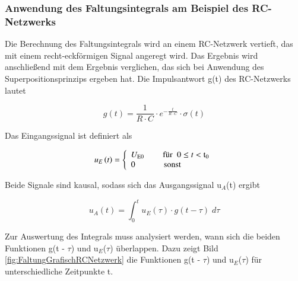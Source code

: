 \subsubsection{Anwendung des Faltungsintegrals am Beispiel des RC-Netzwerks}\label{threefourfour}

\noindent Die Berechnung des Faltungsintegrals wird an einem RC-Netzwerk vertieft, das mit einem recht-eckförmigen Signal angeregt wird. Das Ergebnis wird anschließend mit dem Ergebnis verglichen, das sich bei Anwendung des Superpositionsprinzips ergeben hat. Die Impulsantwort g(t) des RC-Netzwerks lautet

\begin{equation}\label{eq:threehundredseventyfour}
g\left(t\right)=\frac{1}{R\cdot C} \cdot e^{-\frac{t}{R\cdot C} } \cdot \sigma \left(t\right)
\end{equation}

\noindent Das Eingangssignal ist definiert als

\begin{equation}\label{eq:threehundredseventyfive}
u_{E} \left(t\right)=\left\{\begin{array}{l} 
{U_{{\rm E0}} \qquad  \text{ für } \; 0\le  t<\rm t_{0} } \\ 
0\qquad \quad \;\, \text{sonst}
\end{array}\right.
\end{equation}

\noindent Beide Signale sind kausal, sodass sich das Ausgangssignal u${}_{A}$(t) ergibt

\begin{equation}\label{eq:threehundredseventysix}
u_{A} \left(t\right)=\int _{0}^{t}u_{E} \left(\tau \right)\cdot g\left(t-\tau \right)\;d\tau
\end{equation}

\noindent Zur Auswertung des Integrals muss analysiert werden, wann sich die beiden Funktionen g(t - $\tau$) und u${}_{E}$($\tau$) \"{u}berlappen. Dazu zeigt Bild \ref{fig:FaltungGrafischRCNetzwerk} die Funktionen g(t - $\tau$) und u${}_{E}$($\tau$) f\"{u}r unterschiedliche Zeitpunkte t.

